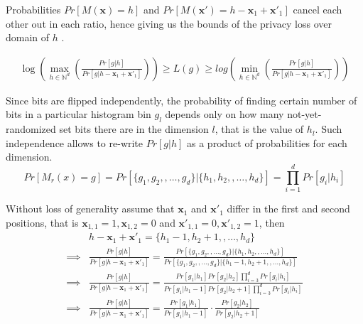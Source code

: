 \documentclass[11pt]{article}
\newcommand{\bbx}{\pmb{x}}
\newcommand{\N}{\mathbb{N}}
\begin{document}
Probabilities $Pr \left [  M(\bbx) = h \right ]$ and $ Pr \left [  M(\bbx') = h - \bbx_1 + \bbx'_1 \right ]$ cancel each other out in each ratio, hence giving us the bounds of the privacy loss over domain of $h$ .

\begin{align*}
\log \left ( \max_{h \in \N^d} \left ( \frac{  Pr [ g | h ]   } { Pr [ g | h  - \bbx_1 + \bbx'_1  ]  }    \right ) \right ) \ge L(g) \ge  log \left ( \min_{h \in \N^d}  \left ( \frac{  Pr [ g | h ]   } {    Pr [ g | h  - \bbx_1 + \bbx'_1  ]  }  \right ) \right )
\end{align*}

Since bits are flipped independently, the probability of finding certain number of bits in a particular histogram bin $g_l$ depends only on how many not-yet-randomized set bits there are in the dimension $l$, that is the value of $h_l$.  Such independence allows to re-write $Pr [ g | h]$ as a product of probabilities for each dimension.
 \[
Pr [ M_r(x) = g ] = Pr [    \{ {g}_1, {g}_2, , \dots, {g}_d\} |  \{ {h}_1, {h}_2, , \dots, {h}_d\} ] = \prod_{i=1}^d Pr[ g_i | h_i] 
\]

Without loss of generality assume that $\bbx_1$ and $\bbx'_1$ differ in the first and second positions, that is $\bbx_{1,1} = 1, \bbx_{1,2} = 0$ and $\bbx'_{1,1} = 0, \bbx'_{1,2} = 1$, then
\begin{align*}
 & h  - \bbx_1 + \bbx'_1 = \{ {h}_1 - 1, {h}_2 + 1, , \dots, {h}_d\} \\
 \implies &  \frac{  Pr [ g | h ]   } {    Pr [ g | h  - \bbx_1 + \bbx'_1  ]  } = \frac{ Pr [    \{ {g}_1, {g}_2, , \dots, {g}_d\} |  \{ {h}_1, {h}_2, , \dots, {h}_d\} ] } { Pr [    \{ {g}_1, {g}_2, , \dots, {g}_d\} |  \{ {h}_1 - 1, {h}_2 + 1, , \dots, {h}_d\} ]  } \\
  \implies &  \frac{  Pr [ g | h ]   } {    Pr [ g | h  - \bbx_1 + \bbx'_1  ]  } = \frac{  Pr[ g_1 | h_1] Pr[ g_2 | h_2] \prod_{i=3}^d Pr[ g_i | h_i]  } {  Pr[ g_1 | h_1 - 1] Pr[ g_2 | h_2 + 1] \prod_{i=3}^d Pr[ g_i | h_i]  }  \\
   \implies &  \frac{  Pr [ g | h ]   } {    Pr [ g | h  - \bbx_1 + \bbx'_1  ]  } =   \frac{  Pr[ g_1 | h_1]  } {  Pr[ g_1 | h_1 - 1]  } \cdot \frac{  Pr[ g_2 | h_2]  } {  Pr[ g_2 | h_2 + 1]  } 
\end{align*}
\end{document}
